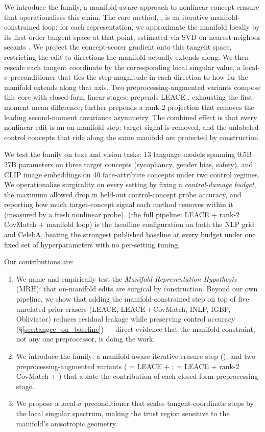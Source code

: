 We introduce the \TanGCE{} family, a manifold-aware approach to nonlinear concept erasure that operationalises this claim. The core method, \TanGCE{}, is an iterative manifold-constrained loop: for each representation, we approximate the manifold locally by its first-order tangent space at that point, estimated via SVD on nearest-neighbor secants \citep{zhang-zha-2004-ltsa}. We project the concept-scorer gradient onto this tangent space, restricting the edit to directions the manifold actually extends along. We then rescale each tangent coordinate by the corresponding local singular value, a local-$\sigma$ preconditioner that ties the step magnitude in each direction to how far the manifold extends along that axis. Two preprocessing-augmented variants compose this core with closed-form linear stages: \TanGCEp{} prepends LEACE \citep{belrose-etal-2023-leace}, exhausting the first-moment mean difference; \TanGCEpp{} further prepends a rank-2 projection that removes the leading second-moment covariance asymmetry. The combined effect is that every nonlinear edit is an on-manifold step: target signal is removed, and the unlabeled control concepts that ride along the same manifold are protected by construction.

We test the \TanGCE{} family on text and vision tasks: 13 language models spanning 0.5B--27B parameters on three target concepts (sycophancy, gender bias, safety), and CLIP image embeddings on 40 face-attribute concepts under two control regimes. We operationalize surgicality on every setting by fixing a \emph{control-damage budget}, the maximum allowed drop in held-out control-concept probe accuracy, and reporting how much target-concept signal each method removes within it (measured by a fresh nonlinear probe). \TanGCEpp{} (the full pipeline: LEACE + rank-2 CovMatch + manifold loop) is the headline configuration on both the NLP grid and CelebA, beating the strongest published baseline at every budget under one fixed set of hyperparameters with no per-setting tuning.

Our contributions are:
\begin{enumerate}
    \item We name and empirically test the \emph{Manifold Representation Hypothesis} (MRH): that on-manifold edits are surgical by construction. Beyond our own pipeline, we show that adding the manifold-constrained step on top of five unrelated prior erasers (LEACE, LEACE\,+\,CovMatch, INLP, IGBP, Obliviator) reduces residual leakage while preserving control accuracy (§\ref{sec:tangce_on_baseline}) --- direct evidence that the manifold constraint, not any one preprocessor, is doing the work.
    \item We introduce the \TanGCE{} family: a manifold-aware iterative erasure step (\TanGCE{}), and two preprocessing-augmented variants (\TanGCEp{} = LEACE + \TanGCE{}; \TanGCEpp{} = LEACE + rank-2 CovMatch + \TanGCE{}) that ablate the contribution of each closed-form preprocessing stage.
    \item We propose a local-$\sigma$ preconditioner that scales tangent-coordinate steps by the local singular spectrum, making the trust region sensitive to the manifold's anisotropic geometry.
\end{enumerate}
